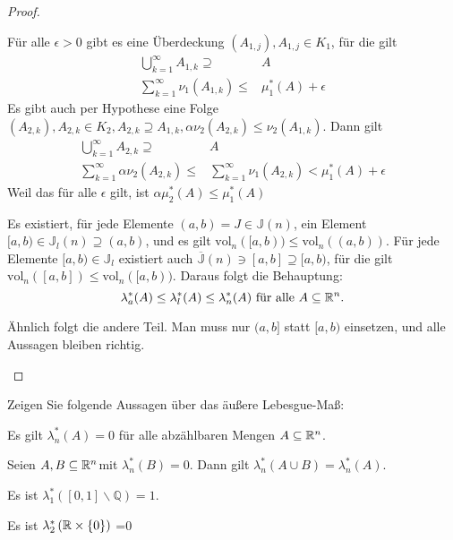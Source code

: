\begin{proof}
	\begin{parts}
	\item F\"{u}r alle $\epsilon>0$ gibt es eine Überdeckung $(A_{1,j}),A_{1,j}\in K_1$, f\"{u}r die gilt
		 \begin{align*}
			 \bigcup_{k=1}^\infty A_{1,k}\supseteq& A\\
			 \sum_{k=1}^{\infty} \nu_1(A_{1,k})\le& \mu_1^*(A)+\epsilon 
		\end{align*}
		Es gibt auch per Hypothese eine Folge $(A_{2,k}), A_{2,k}\in K_2, A_{2,k}\supseteq A_{1,k}, \alpha\nu_2(A_{2,k})\le \nu_2(A_{1,k})$. Dann gilt
		\begin{align*}
			\bigcup_{k=1} ^\infty A_{2,k}\supseteq& A\\
			\sum_{k=1}^{\infty} \alpha\nu_2(A_{2,k})\le& \sum_{k=1}^{\infty} \nu_1(A_{2,k})<\mu_1^*(A)+\epsilon
		\end{align*}
		Weil das f\"{u}r alle $\epsilon$ gilt, ist $\alpha\mu_2^*(A)\le \mu_1^*(A)$
	\item Es existiert, f\"{u}r jede Elemente $(a,b)=J\in \mathbb{J}(n)$, ein Element $[a,b)\in\mathbb{J}_l(n)\supseteq (a,b)$, und es gilt  $\text{vol}_n([a,b))\le \text{vol}_n((a,b))$. F\"{u}r jede Elemente  $[a,b)\in\mathbb{J}_l$ existiert auch $\overline{\mathbb{J}}(n)\ni [a,b]\supseteq [a,b)$, f\"{u}r die gilt $\text{vol}_n([a,b])\le \text{vol}_n([a,b))$. Daraus folgt die Behauptung:
		 \[
			 \lambda_a^*(A)\le \lambda_l^*(A)\le \lambda_n^*(A)\text{ f\"{u}r alle }A\subseteq \mathbb{R}^n
		.\] 

		Ähnlich folgt die andere Teil. Man muss nur $(a,b]$ statt $[a,b)$ einsetzen, und alle Aussagen bleiben richtig.\qedhere
	\end{parts}
\end{proof}
\begin{Problem}
	Zeigen Sie folgende Aussagen über das äußere Lebesgue-Maß:
	\begin{parts}
	\item Es gilt $\lambda_n^*(A)=0$ f\"{u}r alle abz\"{a}hlbaren Mengen $A\subseteq \mathbb{R}^n$.
	\item Seien  $A,B\subseteq \mathbb{R}^n$mit  $\lambda_n^*(B)=0$. Dann gilt $\lambda_n^*(A\cup B)=\lambda_n^*(A)$.
	\item Es ist $\lambda_1^*\left( [0,1]\backslash \mathbb{Q} \right) =1$.
\item Es ist $\lambda_2^*\left( \mathbb{R}\times \left\{ 0 \right\}  \right)$ =0
	\end{parts}
\end{Problem}
